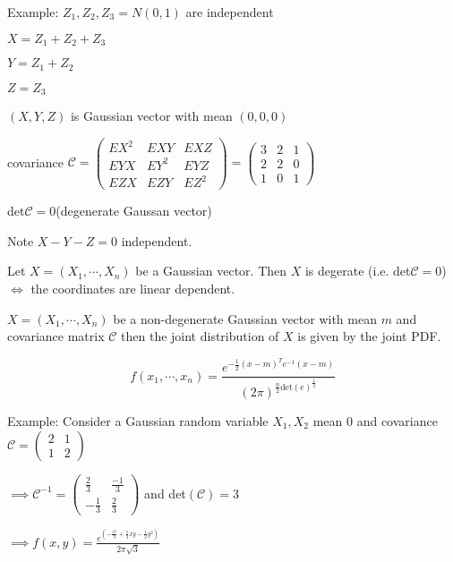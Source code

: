 Example: $Z_1, Z_2, Z_3 = N(0,1)$ are independent

$X = Z_1 + Z_2 + Z_3$

$Y = Z_1 + Z_2$

$Z = Z_3$

$(X,Y,Z)$ is Gaussian vector with mean $(0,0,0)$

covariance $\mathscr{C} =
\left(\begin{matrix}
EX^2 & EXY & EXZ \\
EYX & EY^2 & EYZ \\
EZX & EZY & EZ^2
\end{matrix}\right)
= 
\left(\begin{matrix}
3 & 2 & 1 \\
2 & 2 & 0\\
1 & 0 & 1
\end{matrix}\right)$

det$\mathscr{C} = 0$(degenerate Gaussan vector)

Note $X - Y - Z =0$ independent.

\begin{lmma}
	Let $X = (X_1,\cdots,X_n)$ be a Gaussian vector. Then $X$ is degerate (i.e. det$\mathscr{C} = 0$) $\Leftrightarrow$ the coordinates are linear dependent.
\end{lmma}

\begin{prop*}
	$X = (X_1,\cdots,X_n)$ be a non-degenerate Gaussian vector with mean $m$ and covariance matrix $\mathscr{C}$ then the joint distribution of $X$ is given by the joint PDF.
	
	$$f(x_1,\cdots,x_n) = \frac{e^{-\frac{1}{2}(x - m)^Te^{-1}(x-m)}}{(2\pi)^{\frac{n}{2}\text{det}(e)^{\frac{1}{2}}}}$$
\end{prop*}

Example: Consider a Gaussian random variable $X_1,X_2$ mean $0$ and covariance $\mathscr{C} =
\left(\begin{matrix}
2 & 1 \\ 1 & 2
\end{matrix}\right)$

$\implies \mathscr{C}^{-1} =
\left(\begin{matrix}
\frac{2}{3} & \frac{-1}{3} \\ -\frac{1}{3} & \frac{2}{3}
\end{matrix}\right)$
and det$(\mathscr{C}) = 3$

$\implies f(x,y) = \frac{e^{(-\frac{x^2}{3} + \frac{1}{3}xy - \frac{1}{3}y^2)}}{2\pi\sqrt{3}}$



